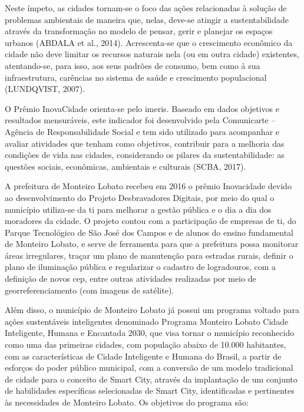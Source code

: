 Neste ímpeto, as cidades tornam-se o foco das ações relacionadas à solução de problemas ambientais de maneira que, nelas, deve-se atingir a sustentabilidade através da transformação no modelo de pensar, gerir e planejar os espaços urbanos (ABDALA et al., 2014). Acrescenta-se que o crescimento econômico da cidade não deve limitar os recursos naturais nela (ou em outra cidade) existentes, atentando-se, para isso, aos seus padrões de consumo, bem como à sua infraestrutura, carências no sistema de saúde e crescimento populacional (LUNDQVIST, 2007).

O Prêmio InovaCidade orienta-se pelo \gls{imeris}. Baseado em dados objetivos e resultados mensuráveis, este indicador foi desenvolvido pela Comunicarte – Agência de Responsabilidade Social e tem sido utilizado para acompanhar e avaliar atividades que tenham como objetivos, contribuir para a melhoria das condições de vida nas cidades, considerando os pilares da sustentabilidade: as questões sociais, econômicas, ambientais e culturais (SCBA, 2017).

A prefeitura de Monteiro Lobato recebeu em 2016 o prêmio Inovacidade devido ao desenvolvimento do Projeto Desbravadores Digitais, por meio do qual o município utiliza-se da \gls{ti} para melhorar a gestão pública e o dia a dia dos moradores da cidade. O projeto contou com a participação de empresas de \gls{ti}, do Parque Tecnológico de São José dos Campos e de alunos do ensino fundamental de Monteiro Lobato, e serve de ferramenta para que a prefeitura possa monitorar áreas irregulares, traçar um plano de manutenção para estradas rurais, definir o plano de iluminação pública e regularizar o cadastro de logradouros, com a definição de novos \gls{cep}, entre outras atividades realizadas por meio de georreferenciamento (com imagens de satélite).

Além disso, o município de Monteiro Lobato já possui um programa voltado para ações sustentáveis inteligentes denominado Programa Monteiro Lobato Cidade Inteligente, Humana e Encantada 2030, que visa tornar o município reconhecido como uma das primeiras cidades, com população abaixo de 10.000 habitantes, com as características de Cidade Inteligente e Humana do Brasil, a partir de esforços do poder público municipal, com a conversão de um modelo tradicional de cidade para o conceito de Smart City, através da implantação de um conjunto de habilidades específicas selecionadas de Smart City, identificadas e pertinentes às necessidades de Monteiro Lobato. Os objetivos do programa são:


